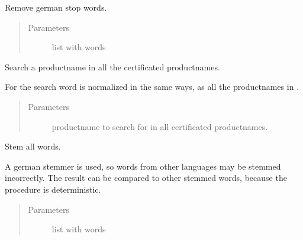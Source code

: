 \documentclass[letterpaper,10pt,english]{sphinxmanual}
\begin{document}
\begin{fulllineitems}

\begin{fulllineitems}
\label{\detokenize{api:geoschutz_check.Geoschutz.remove_stop_words}}
Remove german stop words.
\begin{quote}\begin{description}
\item[{Parameters}] \leavevmode
{} \textendash{} list with words

\end{description}\end{quote}

\end{fulllineitems}


\begin{fulllineitems}
\label{\detokenize{api:geoschutz_check.Geoschutz.search}}
Search a productname in all the certificated productnames.

For the search word is normalized in the same ways, as all the
productnames in .
\begin{quote}\begin{description}
\item[{Parameters}] \leavevmode
{} \textendash{} productname to search for in all certificated
productnames.

\end{description}\end{quote}

\end{fulllineitems}


\begin{fulllineitems}
\label{\detokenize{api:geoschutz_check.Geoschutz.stem_all_words}}
Stem all words.

A german stemmer is used, so words from other languages may be
stemmed incorrectly. The result can be compared to other
stemmed words, because the procedure is deterministic.
\begin{quote}\begin{description}
\item[{Parameters}] \leavevmode
{} \textendash{} list with words

\end{description}\end{quote}

\end{fulllineitems}


\end{fulllineitems}
\end{document}
